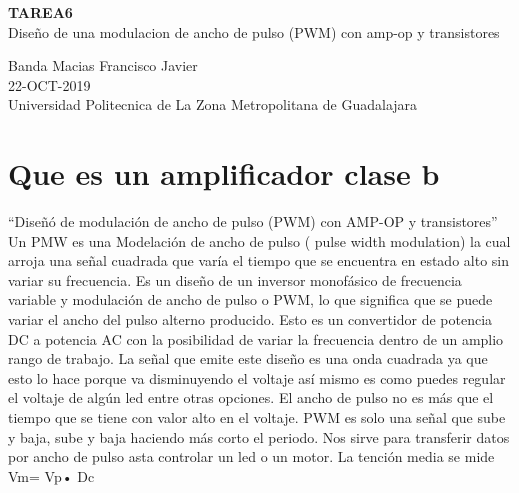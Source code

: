 \documentclass[11pt,a4paper]{article}
\begin{document}
\begin{center}
\textbf{TAREA6}\\ 
Diseño  de una modulacion de ancho de pulso (PWM) con amp-op y transistores 
\end{center}

\begin{center}
Banda Macias Francisco Javier\\
22-OCT-2019\\
Universidad Politecnica de La Zona Metropolitana de Guadalajara
\end{center}


\section{Que es un amplificador clase b}
“Diseñó de modulación de ancho de pulso (PWM) con AMP-OP y transistores”
Un PMW es una  Modelación de ancho de pulso ( pulse width modulation) la cual arroja una señal cuadrada que varía el tiempo que se encuentra en estado alto sin variar su frecuencia.
Es un diseño de un inversor monofásico de frecuencia variable y modulación de ancho de pulso o PWM, lo que 
significa que se puede variar el ancho del pulso alterno producido. Esto es un 
convertidor de potencia DC a potencia AC con la posibilidad de variar la frecuencia 
dentro de un amplio rango de trabajo.
La señal que emite este diseño  es una onda cuadrada ya que esto lo hace porque va disminuyendo el voltaje así mismo es como puedes regular el voltaje de algún led entre otras opciones.
El ancho de pulso no es más que el tiempo que se tiene con valor alto en el voltaje. PWM es solo una señal que sube y baja, sube y baja haciendo más corto el periodo.
Nos sirve para transferir datos por ancho de pulso asta controlar un led o un motor.
La tención media se mide Vm= Vp• Dc
\end{document}
